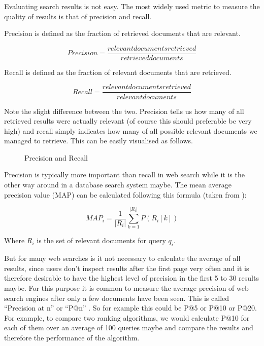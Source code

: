 Evaluating search results is not easy. The most widely used metric to measure the quality of results is that of precision and recall.

Precision is defined as the fraction of retrieved documents that are relevant.

\begin{equation}
  Precision = \frac{relevant documents retrieved}{retrieved documents}
  \label{eq:precision}
\end{equation}

Recall is defined as the fraction of relevant documents that are retrieved.

\begin{equation}
  Recall = \frac{relevant documents retrieved}{relevant documents}
  \label{eq:recall}
\end{equation}

Note the slight difference between the two. Precision tells us how many of all retrieved results were actually relevant (of course this should preferable be very high) and recall simply indicates how many of all possible relevant documents we managed to retrieve. This can be easily visualised as follows.

\begin{figure}[htbp]
  \centering
  
  \caption[Precision and Recall]{Precision and Recall}
\label{fig:PR}
\end{figure}

Precision is typically more important than recall in web search while it is the other way around in a database search system maybe. The mean average precision value (MAP) can be calculated following this formula (taken from \citep[p.141]{Baeza-Yates2011}):

\begin{equation}
  MAP_i = \frac{1}{|R_i|} \sum_{k=1}^{|R_i|} P(R_i[k])
  \label{eq:MAP}
\end{equation}

Where $R_i$ is the set of relevant documents for query $q_i$.

But for many web searches is it not necessary to calculate the average of all results, since users don't inspect results after the first page very often and it is therefore desirable to have the highest level of precision in the first 5 to 30 results maybe. For this purpose it is common to measure the average precision of web search engines after only a few documents have been seen. This is called ``Precision at n'' or ``P@n'' \citep[p.140]{Baeza-Yates2011}. So for example this could be P@5 or P@10 or P@20. For example, to compare two ranking algorithms, we would calculate P@10 for each of them over an average of 100 queries maybe and compare the results and therefore the performance of the algorithm.

